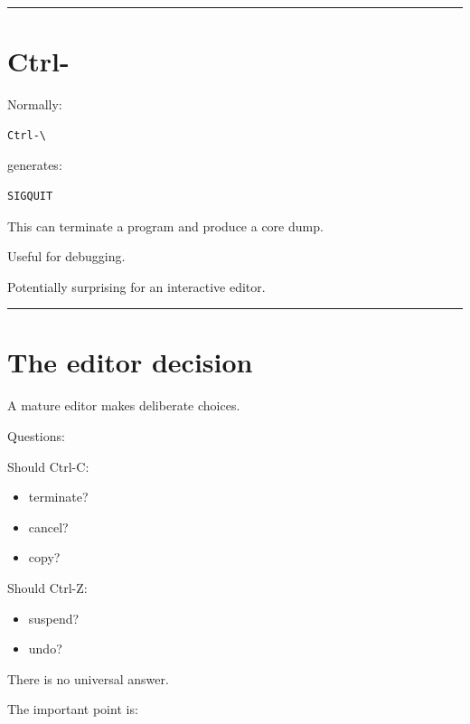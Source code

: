 \documentclass[
  oneside,
  openany]{book}
\providecommand{\tightlist}{%
  \setlength{\itemsep}{0pt}\setlength{\parskip}{0pt}}
\begin{document}
\begin{center}\rule{0.5\linewidth}{0.5pt}\end{center}

\hypertarget{ctrl-}{%
\section{\texorpdfstring{Ctrl-\\
}{Ctrl- }}\label{ctrl-}}

Normally:

\begin{verbatim}
Ctrl-\
\end{verbatim}

generates:

\begin{verbatim}
SIGQUIT
\end{verbatim}

This can terminate a program and produce a core dump.

Useful for debugging.

Potentially surprising for an interactive editor.

\begin{center}\rule{0.5\linewidth}{0.5pt}\end{center}

\hypertarget{the-editor-decision}{%
\section{The editor decision}\label{the-editor-decision}}

A mature editor makes deliberate choices.

Questions:

Should Ctrl-C:

\begin{itemize}
\tightlist
\item
  terminate?
\item
  cancel?
\item
  copy?
\end{itemize}

Should Ctrl-Z:

\begin{itemize}
\tightlist
\item
  suspend?
\item
  undo?
\end{itemize}

There is no universal answer.

The important point is:
\end{document}

